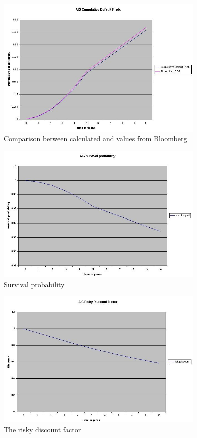 \begin{figure}
\begin{center}
        \includegraphics[width=10cm]{creditcurve-cumdefaultprob.jpg}
        \caption{Comparison between calculated and values from Bloomberg}
\end{center}
\end{figure}

\begin{figure}
\begin{center}
        \includegraphics[width=10cm]{creditcurve-survivalprob.jpg}
        \caption{Survival probability}
\end{center}
\end{figure}

\begin{figure}
\begin{center}
        \includegraphics[width=10cm]{creditcurve-riskydiscount.jpg}
        \caption{The risky discount factor}
\end{center}
\end{figure}

